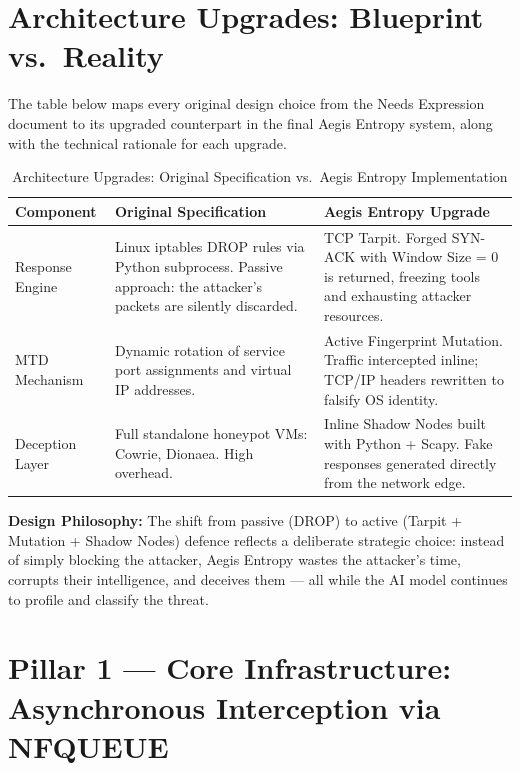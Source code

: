 \documentclass[12pt,a4paper]{report}
\begin{document}
\chapter{Architecture Upgrades: Blueprint vs.\ Reality}

The table below maps every original design choice from the Needs Expression document to its
upgraded counterpart in the final Aegis Entropy system, along with the technical rationale for
each upgrade.

\begin{table}[h!]
\centering
\caption{Architecture Upgrades: Original Specification vs.\ Aegis Entropy Implementation}
\begin{tabular}{@{}L{3cm} L{5cm} L{6.5cm}@{}}
  \toprule
  \textbf{Component} & \textbf{Original Specification} & \textbf{Aegis Entropy Upgrade} \\
  \midrule
  Response Engine
    & Linux iptables DROP rules via Python subprocess. Passive approach: the attacker's
      packets are silently discarded.
    & TCP Tarpit. Forged SYN-ACK with Window Size = 0 is returned, freezing tools and
      exhausting attacker resources. \\
  \addlinespace
  MTD Mechanism
    & Dynamic rotation of service port assignments and virtual IP addresses.
    & Active Fingerprint Mutation. Traffic intercepted inline; TCP/IP headers rewritten
      to falsify OS identity. \\
  \addlinespace
  Deception Layer
    & Full standalone honeypot VMs: Cowrie, Dionaea. High overhead.
    & Inline Shadow Nodes built with Python + Scapy. Fake responses generated directly
      from the network edge. \\
  \bottomrule
\end{tabular}
\label{tab:upgrades}
\end{table}

\textbf{Design Philosophy:} The shift from passive (DROP) to active (Tarpit + Mutation +
Shadow Nodes) defence reflects a deliberate strategic choice: instead of simply blocking the
attacker, Aegis Entropy wastes the attacker's time, corrupts their intelligence, and deceives
them --- all while the AI model continues to profile and classify the threat.

\chapter{Pillar 1 --- Core Infrastructure: Asynchronous Interception via NFQUEUE}
\end{document}
